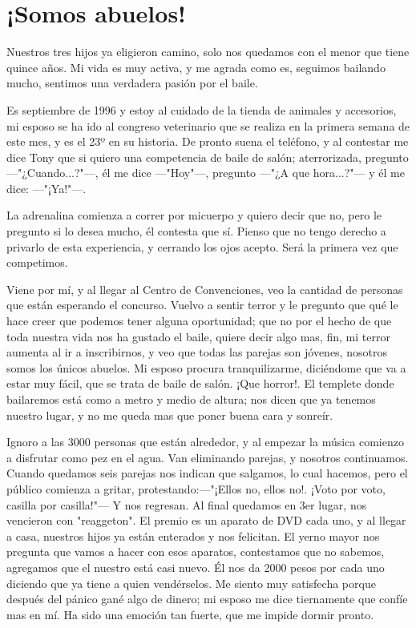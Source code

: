 \documentclass[letterpaper, 12pt]{book}
\begin{document}
\chapter{¡Somos abuelos!}
Nuestros tres hijos ya eligieron camino, solo nos quedamos con el menor que tiene quince años. Mi vida es muy activa, y me agrada como es, seguimos bailando mucho, sentimos una verdadera pasión por el baile.  

Es septiembre de 1996 y estoy al cuidado de la tienda de animales y accesorios, mi esposo se ha ido al congreso veterinario que se realiza en la primera semana de este mes, y es el 23º en su historia. De pronto suena el teléfono, y al contestar me dice Tony que si quiero una competencia de baile de salón; aterrorizada, pregunto ---"¿Cuando...?"---, él me dice ---"Hoy"---, pregunto ---"¿A que hora...?"--- y él me dice: ---"¡Ya!"---.

La adrenalina comienza a correr por micuerpo y quiero decir que no, pero le pregunto si lo desea mucho, él contesta que sí. Pienso que no tengo derecho a privarlo de esta experiencia, y cerrando los ojos acepto. Será la primera vez que competimos.

Viene por mí, y al llegar al Centro de Convenciones, veo la cantidad de personas que están esperando el concurso. Vuelvo a sentir terror y le pregunto que qué le hace creer que podemos tener alguna oportunidad; que no por el hecho de que toda nuestra vida nos ha gustado el baile, quiere decir algo mas, fin, mi terror aumenta al ir a inscribirnos, y veo que todas las parejas son jóvenes, nosotros somos los únicos abuelos. Mi esposo procura tranquilizarme, diciéndome que va a estar muy fácil, que se trata de baile de salón. ¡Que horror!. El templete donde bailaremos está como a metro y medio de altura; nos dicen que ya tenemos nuestro lugar, y no me queda mas que poner buena cara y sonreír. 

Ignoro a las 3000 personas que están alrededor, y al empezar la música comienzo a disfrutar como pez en el agua. Van eliminando parejas, y nosotros continuamos. Cuando quedamos seis parejas nos indican que salgamos, lo cual hacemos, pero el público comienza a gritar, protestando:---"¡Ellos no, ellos no!. ¡Voto por voto, casilla por casilla!"--- Y nos regresan. Al final quedamos en 3er lugar, nos vencieron con "reaggeton". El premio es un aparato de DVD cada uno, y al llegar a casa, nuestros hijos ya están enterados y nos felicitan. El yerno mayor nos pregunta que vamos a hacer con esos aparatos, contestamos que no sabemos, agregamos que el nuestro está casi nuevo. Él nos da 2000 pesos por cada uno diciendo que ya tiene a quien vendérselos. Me siento muy satisfecha porque después del pánico gané algo de dinero; mi esposo me dice tiernamente que confíe mas en mí. Ha sido una emoción tan fuerte, que me impide dormir pronto.
\end{document}
